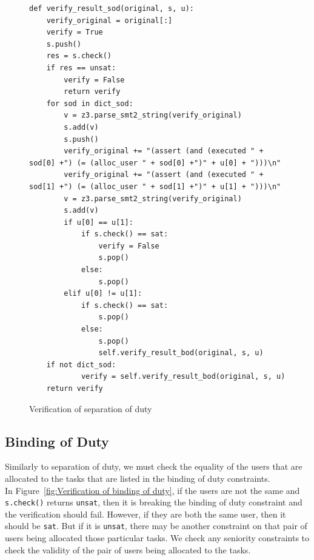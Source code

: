 \documentclass[a4paper]{report}
\begin{document}
\begin{figure}[H]
\lstset{numbers=left, showspaces=false,
    showstringspaces=false, tabsize=2, breaklines=true,
    xleftmargin=5.0ex,
}
\begin{lstlisting}[frame=single]
def verify_result_sod(original, s, u):
	verify_original = original[:]
	verify = True
	s.push()
	res = s.check()
	if res == unsat:
		verify = False
		return verify
	for sod in dict_sod:
		v = z3.parse_smt2_string(verify_original)
		s.add(v)
		s.push()
		verify_original += "(assert (and (executed " + sod[0] +") (= (alloc_user " + sod[0] +")" + u[0] + ")))\n"
		verify_original += "(assert (and (executed " + sod[1] +") (= (alloc_user " + sod[1] +")" + u[1] + ")))\n"
		v = z3.parse_smt2_string(verify_original)
		s.add(v)
		if u[0] == u[1]:
			if s.check() == sat:
				verify = False
				s.pop()
			else:
				s.pop()
		elif u[0] != u[1]:
			if s.check() == sat:
				s.pop()
			else:
				s.pop()
				self.verify_result_bod(original, s, u)
	if not dict_sod:
            verify = self.verify_result_bod(original, s, u)
	return verify
\end{lstlisting}
\caption{Verification of separation of duty}
\label{Verification of separation of duty}
\end{figure}

\newpage

\subsection{Binding of Duty}
Similarly to separation of duty, we must check the equality of the users that are allocated to the tasks that are listed in the binding of duty constraints.\\ 

In Figure~\ref{fig:Verification of binding of duty}, if the users are not the same and \texttt{s.check()} returns \texttt{unsat}, then it is breaking the binding of duty constraint and the verification should fail. However, if they are both the same user, then it should be \texttt{sat}. But if it is \texttt{unsat}, there may be another constraint on that pair of users being allocated those particular tasks. We check any seniority constraints to check the validity of the pair of users being allocated to the tasks.\\
\end{document}
